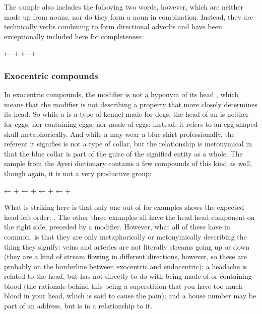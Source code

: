 The sample also includes the following two words, however, which are neither 
made up from nouns, nor do they form a noun in combination. Instead, they are 
technically verbs combining to form directional adverbs and have been 
exceptionally included here for completeness:

\pex
	\a {}
		← 
		+ 
	\a {}
		← 
		+ 
\xe


\subsubsection{Exocentric compounds}

In exocentric compounds, the modifier is not a hyponym of its head 
\citep[700]{bauer2001}, which means that the modifier is not 
describing a property that more closely determines its head. So while a  is a type of kennel made for dogs, the head of an  is 
neither for eggs, nor containing eggs, nor made of eggs; instead, it refers to 
an egg-shaped skull metaphorically. And while a  may wear a blue 
shirt professionally, the referent it signifies is not a type of collar, but 
the relationship is metonymical in that the blue collar is part of the 
guise of the signified entity as a whole. The sample from the Ayeri dictionary 
contains a few compounds of this kind as well, though again, it is 
not a very productive group:

\pex
	\a {}
		← 
		+ 
	\a {}
		← 
		+ 
	\a {}
		← 
		+ 
	\a {}
		← 
		+ 
\xe

What is striking here is that only one out of for examples shows the expected 
head-left order: . The other three examples all have 
the head head component on the right side, preceded by a modifier. However, 
what all of these have in common, is that they are only metaphorically or 
metonymically describing the thing they signify: veins and arteries are not 
literally streams going up or down (they are a kind of stream flowing in 
different directions, however, so these are probably on the borderline between 
exocentric and endocentric); a headache is related to the head, but has not 
directly to do with being made of or containing blood (the rationale 
behind this being a superstition that you have too much blood in your head, 
which is said to cause the pain); and a house number may be part of an 
address, but is in a  relationship to it.

